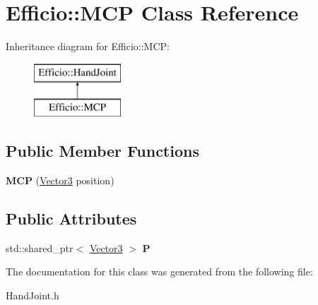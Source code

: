 \hypertarget{class_efficio_1_1_m_c_p}{}\section{Efficio\+:\+:M\+CP Class Reference}
\label{class_efficio_1_1_m_c_p}
Inheritance diagram for Efficio\+:\+:M\+CP\+:\begin{figure}[H]
\begin{center}
\leavevmode
\includegraphics[height=2.000000cm]{class_efficio_1_1_m_c_p}
\end{center}
\end{figure}
\subsection*{Public Member Functions}
\begin{DoxyCompactItemize}
\item 
{\bfseries M\+CP} (\hyperlink{class_efficio_1_1_vector3}{Vector3} position)\hypertarget{class_efficio_1_1_m_c_p_a3dd5a13b65af8dd001f540a1f2865d96}{}\label{class_efficio_1_1_m_c_p_a3dd5a13b65af8dd001f540a1f2865d96}

\end{DoxyCompactItemize}
\subsection*{Public Attributes}
\begin{DoxyCompactItemize}
\item 
std\+::shared\+\_\+ptr$<$ \hyperlink{class_efficio_1_1_vector3}{Vector3} $>$ {\bfseries P}\hypertarget{class_efficio_1_1_m_c_p_a6081a61313bfa0e5de228d9225ded09b}{}\label{class_efficio_1_1_m_c_p_a6081a61313bfa0e5de228d9225ded09b}

\end{DoxyCompactItemize}


The documentation for this class was generated from the following file\+:\begin{DoxyCompactItemize}
\item 
Hand\+Joint.\+h\end{DoxyCompactItemize}
